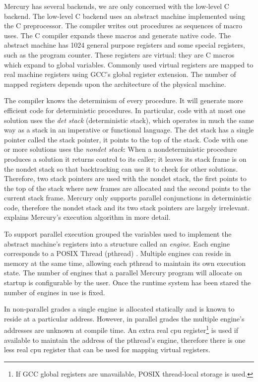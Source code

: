 
Mercury has several backends,
we are only concerned with the low-level C backend.
The low-level C backend uses an abstract machine implemented using the C
preprocessor.
The compiler writes out procedures as sequences of macro uses.
The C compiler expands these macros and generate native code.
The abstract machine has 1024 general purpose registers and some
special registers, such as the program counter.
These registers are virtual:
they are C macros which expand to global variables.
Commonly used virtual registers are mapped to real machine registers
using GCC's \citep{gcc} global register extension.
The number of mapped registers depends upon the architecture of the physical
machine.

The compiler knows the determinism of every procedure.
It will generate more efficient code for deterministic procedures.
In particular,
code with at most one solution uses the \emph{det stack} (deterministic
stack),
which operates in much the same way as a stack in an imperative or
functional language.
The det stack has a single pointer called the stack pointer,
it points to the top of the stack.
Code with one or more solutions uses the \emph{nondet stack}:
When a nondeterministic procedure produces a solution it returns control to
its caller;
it leaves its stack frame is on the nondet stack so that backtracking can
use it to check for other solutions.
Therefore,
two stack pointers are used with the nondet stack,
the first points to the top of the stack where new frames are allocated
and the second points to the current stack frame.
Mercury only supports parallel conjunctions in deterministic code,
therefore the nondet stack and its two stack pointers are largely irrelevant.
\citet{mercury_jlp} explains Mercury's execution algorithm in more detail.

To support parallel execution \citet{conway_par} grouped the variables
used to implement the abstract machine's registers into a structure
called an \emph{engine}.
Each engine corresponds to a POSIX Thread (pthread)
\citep{butenhof1997:pthreads}.
Multiple engines can reside in memory at the same time,
allowing each pthread to maintain its own execution state.
The number of engines that a parallel Mercury program will allocate on startup
is configurable by the user.
Once the runtime system has been stared the number of engines in use is
fixed.

In non-parallel grades a single engine is allocated statically and is known
to reside at a particular address.
However,
in parallel grades the multiple engine's addresses are unknown at compile
time.
An extra real cpu register\footnote{
    If GCC global registers are unavailable,
    POSIX thread-local storage is used.
}
is used if available to maintain the address of
the pthread's engine,
therefore there is one less real cpu register that can be used for mapping
virtual registers.

